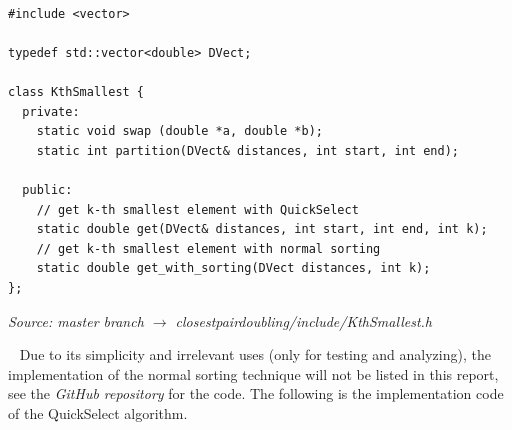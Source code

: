 \documentclass[12pt,english,]{article}
\begin{document}
~

\newpage

\begin{lstlisting}
#include <vector>

typedef std::vector<double> DVect;

class KthSmallest {
  private:
    static void swap (double *a, double *b);
    static int partition(DVect& distances, int start, int end);

  public:
    // get k-th smallest element with QuickSelect
    static double get(DVect& distances, int start, int end, int k);
    // get k-th smallest element with normal sorting 
    static double get_with_sorting(DVect distances, int k);
};
\end{lstlisting}
\vspace{-9truemm}
\begin{minipage}{1\textwidth}
  \begin{flushright}
  {\footnotesize \emph{Source: master branch $\rightarrow$ closestpairdoubling/include/KthSmallest.h}\par}
  \end{flushright}
\end{minipage}
\vspace{0.5truemm}

~ Due to its simplicity and irrelevant uses (only for testing and
analyzing), the implementation of the normal sorting technique will not
be listed in this report, see the \emph{GitHub repository} for the code.
The following is the implementation code of the QuickSelect algorithm.

~
\end{document}
